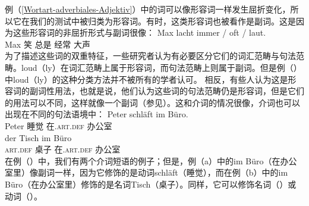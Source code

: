 例（\ref{Wortart-adverbiales-Adjektiv}）中的词可以像形容词一样发生屈折变化，所以它在我们的测试中被归类为形容词。有时，这类形容词也被看作是副词。这是因为这些形容词的非屈折形式与副词很像：
\ea
\gll Max lacht immer / oft / laut.\\
	 Max 笑 总是 {} 经常 {} 大声\\
\z
%
为了描述这些词的双重特征，一些研究者认为有必要区分它们的词汇范畴与句法范畴。loud（ly）在词汇范畴上属于形容词，而句法范畴上则属于副词。但是例（）中loud（ly）的这种分类方法并不被所有的学者认可。
相反，有些人认为这是形容词的副词性用法，也就是说，他们认为这些词的句法范畴仍是形容词，但是它们的用法可以不同，这样就像一个副词（参见\citet[\S~7.3]{Eisenberg2004a}）。这和介词的情况很像，介词也可以出现在不同的句法语境中：
\eal
\ex 
\gll Peter schläft im Büro.\\
     Peter 睡觉 在.\textsc{art}.\textsc{def} 办公室\\
\ex 
\gll der Tisch im Büro\\
     \textsc{art}.\textsc{def} 桌子 在.\textsc{art}.\textsc{def} 办公室\\
\zl
在例（）中，我们有两个介词短语的例子；但是，例（a）中的im Büro（在办公室里）像副词一样，因为它修饰的是动词schläft（睡觉），而在例（b）中的im Büro（在办公室里）修饰的是名词Tisch（桌子）。同样，它可以修饰名词（）或动词（）。
